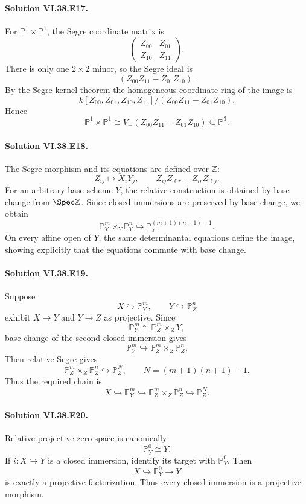 \paragraph{Solution VI.38.E17.}
For \(\mathbb P^1\times\mathbb P^1\), the Segre coordinate matrix is
\[
\begin{pmatrix}
Z_{00}&Z_{01}\\
Z_{10}&Z_{11}
\end{pmatrix}.
\]
There is only one \(2\times2\) minor, so the Segre ideal is
\[
(Z_{00}Z_{11}-Z_{01}Z_{10}).
\]
By the Segre kernel theorem the homogeneous coordinate ring of the image is
\[
k[Z_{00},Z_{01},Z_{10},Z_{11}]/(Z_{00}Z_{11}-Z_{01}Z_{10}).
\]
Hence
\[
\boxed{\mathbb P^1\times\mathbb P^1
\cong V_+(Z_{00}Z_{11}-Z_{01}Z_{10})\subseteq\mathbb P^3}.
\]

\paragraph{Solution VI.38.E18.}
The Segre morphism and its equations are defined over \(\mathbb Z\):
\[
Z_{ij}\longmapsto X_iY_j,
\qquad
Z_{ij}Z_{\ell r}-Z_{ir}Z_{\ell j}.
\]
For an arbitrary base scheme \(Y\), the relative construction is obtained by base
change from \(\Spec\mathbb Z\). Since closed immersions are preserved by base change,
we obtain
\[
\boxed{\mathbb P^m_Y\times_Y\mathbb P^n_Y
\hookrightarrow\mathbb P^{(m+1)(n+1)-1}_Y}.
\]
On every affine open of \(Y\), the same determinantal equations define the image,
showing explicitly that the equations commute with base change.

\paragraph{Solution VI.38.E19.}
Suppose
\[
X\hookrightarrow\mathbb P^m_Y,
\qquad
Y\hookrightarrow\mathbb P^n_Z
\]
exhibit \(X\to Y\) and \(Y\to Z\) as projective.  Since
\[
\mathbb P^m_Y\cong\mathbb P^m_Z\times_ZY,
\]
base change of the second closed immersion gives
\[
\mathbb P^m_Y\hookrightarrow
\mathbb P^m_Z\times_Z\mathbb P^n_Z.
\]
Then relative Segre gives
\[
\mathbb P^m_Z\times_Z\mathbb P^n_Z
\hookrightarrow\mathbb P^N_Z,
\qquad
N=(m+1)(n+1)-1.
\]
Thus the required chain is
\[
\boxed{X\hookrightarrow\mathbb P^m_Y
\hookrightarrow\mathbb P^m_Z\times_Z\mathbb P^n_Z
\hookrightarrow\mathbb P^N_Z}.
\]

\paragraph{Solution VI.38.E20.}
Relative projective zero-space is canonically
\[
\mathbb P^0_Y\cong Y.
\]
If \(i:X\hookrightarrow Y\) is a closed immersion, identify its target with
\(\mathbb P^0_Y\). Then
\[
X\hookrightarrow\mathbb P^0_Y\longrightarrow Y
\]
is exactly a projective factorization. Thus every closed immersion is a projective
morphism.

